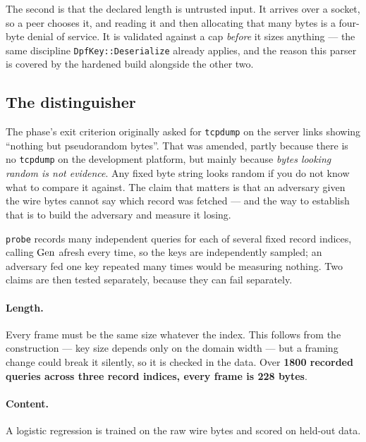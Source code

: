 The second is that the declared length is untrusted input. It arrives over a
socket, so a peer chooses it, and reading it and then allocating that many
bytes is a four-byte denial of service. It is validated against a cap
\emph{before} it sizes anything --- the same discipline
\texttt{DpfKey::Deserialize} already applies, and the reason this parser is
covered by the hardened build alongside the other two.

\subsection{The distinguisher}
\label{sec:tech:net:distinguisher}

The phase's exit criterion originally asked for \texttt{tcpdump} on the server
links showing ``nothing but pseudorandom bytes''. That was amended, partly
because there is no \texttt{tcpdump} on the development platform, but mainly
because \emph{bytes looking random is not evidence}. Any fixed byte string
looks random if you do not know what to compare it against. The claim that
matters is that an adversary given the wire bytes cannot say which record was
fetched --- and the way to establish that is to build the adversary and measure
it losing.

\texttt{probe} records many independent queries for each of several fixed
record indices, calling $\operatorname{Gen}$ afresh every time, so the keys are independently
sampled; an adversary fed one key repeated many times would be measuring
nothing. Two claims are then tested separately, because they can fail
separately.

\paragraph{Length.} Every frame must be the same size whatever the index. This
follows from the construction --- key size depends only on the domain width ---
but a framing change could break it silently, so it is checked in the data.
Over \textbf{1800 recorded queries across three record indices, every frame is
228 bytes}.

\paragraph{Content.} A logistic regression is trained on the raw wire bytes and
scored on held-out data.

